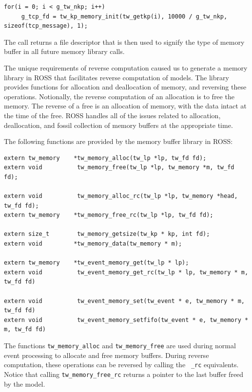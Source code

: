 \documentclass[12pt]{article}
\begin{document}
\begin{small}
\begin{verbatim}
for(i = 0; i < g_tw_nkp; i++)
     g_tcp_fd = tw_kp_memory_init(tw_getkp(i), 10000 / g_tw_nkp, sizeof(tcp_message), 1);
\end{verbatim}
\end{small}

The call returns a file descriptor that is then used to signify the type of
memory buffer in all future memory library calls.

The unique requirements of reverse computation caused us to generate a memory
library in ROSS that facilitates reverse computation of models.  The library
provides functions for allocation and deallocation of memory, and reversing
these operations.  Notionally, the reverse computation of an allocation is to
free the memory.  The reverse of a free is an allocation of memory, with the
data intact at the time of the free.  ROSS handles all of the issues related
to allocation, deallocation, and fossil collection of memory buffers at the
appropriate time.

The following functions are provided by the memory buffer library in ROSS:

\begin{small}
\begin{verbatim}
extern tw_memory    *tw_memory_alloc(tw_lp *lp, tw_fd fd);
extern void          tw_memory_free(tw_lp *lp, tw_memory *m, tw_fd fd);

extern void          tw_memory_alloc_rc(tw_lp *lp, tw_memory *head, tw_fd fd);
extern tw_memory    *tw_memory_free_rc(tw_lp *lp, tw_fd fd);

extern size_t        tw_memory_getsize(tw_kp * kp, int fd);
extern void         *tw_memory_data(tw_memory * m);

extern tw_memory    *tw_event_memory_get(tw_lp * lp);
extern void          tw_event_memory_get_rc(tw_lp * lp, tw_memory * m, tw_fd fd)

extern void          tw_event_memory_set(tw_event * e, tw_memory * m, tw_fd fd)
extern void          tw_event_memory_setfifo(tw_event * e, tw_memory * m, tw_fd fd)
\end{verbatim}
\end{small}

The functions {\tt tw\_memory\_alloc} and {\tt tw\_memory\_free} are used
during normal event processing to allocate and free memory buffers.  During
reverse computation, these operations can be reversed by calling the {\tt
  \_rc} equivalents.  Notice that calling {\tt tw\_memory\_free\_rc} returns a
pointer to the last buffer freed by the model.
\end{document}
